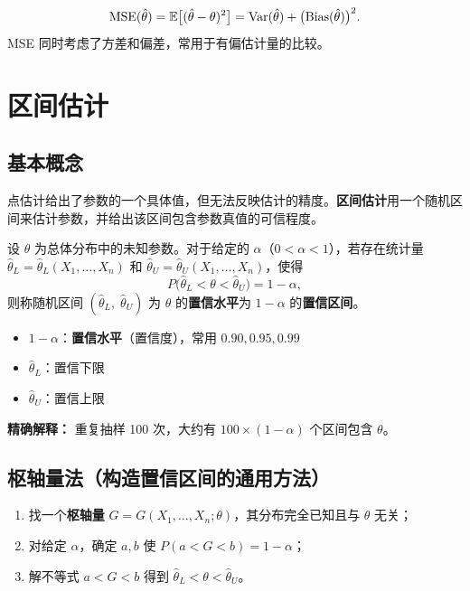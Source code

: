 \begin{definition}[均方误差]
\begin{equation}
    \mathrm{MSE}(\hat{\theta}) = \mathbb{E}\big[(\hat{\theta} - \theta)^2\big]
    = \mathrm{Var}(\hat{\theta}) + \big(\mathrm{Bias}(\hat{\theta})\big)^2.
\end{equation}
MSE 同时考虑了方差和偏差，常用于有偏估计量的比较。
\end{definition}

\section{区间估计}

\subsection{基本概念}

点估计给出了参数的一个具体值，但无法反映估计的精度。\textbf{区间估计}用一个随机区间来估计参数，并给出该区间包含参数真值的可信程度。

\begin{definition}[置信区间]
设 $\theta$ 为总体分布中的未知参数。对于给定的 $\alpha$（$0 < \alpha < 1$），若存在统计量
$\hat{\theta}_L = \hat{\theta}_L(X_1,\dots,X_n)$ 和 $\hat{\theta}_U = \hat{\theta}_U(X_1,\dots,X_n)$，使得
\begin{equation}
    P\big(\hat{\theta}_L < \theta < \hat{\theta}_U\big) = 1 - \alpha,
\end{equation}
则称随机区间 $(\hat{\theta}_L,\; \hat{\theta}_U)$ 为 $\theta$ 的\textbf{置信水平}为 $1 - \alpha$ 的\textbf{置信区间}。
\end{definition}

\begin{itemize}
    \item $1 - \alpha$：\textbf{置信水平}（置信度），常用 $0.90, 0.95, 0.99$
    \item $\hat{\theta}_L$：置信下限
    \item $\hat{\theta}_U$：置信上限
\end{itemize}

\textbf{精确解释：} 重复抽样 100 次，大约有 $100 \times (1-\alpha)$ 个区间包含 $\theta$。

\subsection{枢轴量法（构造置信区间的通用方法）}

\begin{enumerate}
    \item 找一个\textbf{枢轴量} $G = G(X_1,\dots,X_n; \theta)$，其分布完全已知且与 $\theta$ 无关；
    \item 对给定 $\alpha$，确定 $a, b$ 使 $P(a < G < b) = 1 - \alpha$；
    \item 解不等式 $a < G < b$ 得到 $\hat{\theta}_L < \theta < \hat{\theta}_U$。
\end{enumerate}

